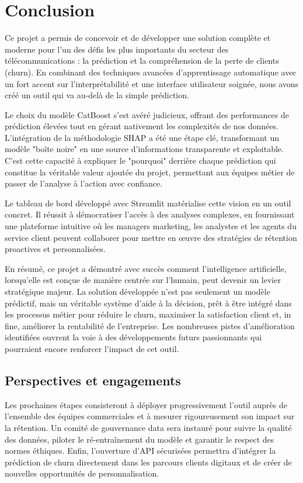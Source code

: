 \chapter{Conclusion}
\label{chap:conclusion}

Ce projet a permis de concevoir et de développer une solution complète et moderne pour l'un des défis les plus importants du secteur des télécommunications : la prédiction et la compréhension de la perte de clients (churn). En combinant des techniques avancées d'apprentissage automatique avec un fort accent sur l'interprétabilité et une interface utilisateur soignée, nous avons créé un outil qui va au-delà de la simple prédiction.

Le choix du modèle CatBoost s'est avéré judicieux, offrant des performances de prédiction élevées tout en gérant nativement les complexités de nos données. L'intégration de la méthodologie SHAP a été une étape clé, transformant un modèle "boîte noire" en une source d'informations transparente et exploitable. C'est cette capacité à expliquer le "pourquoi" derrière chaque prédiction qui constitue la véritable valeur ajoutée du projet, permettant aux équipes métier de passer de l'analyse à l'action avec confiance.

Le tableau de bord développé avec Streamlit matérialise cette vision en un outil concret. Il réussit à démocratiser l'accès à des analyses complexes, en fournissant une plateforme intuitive où les managers marketing, les analystes et les agents du service client peuvent collaborer pour mettre en œuvre des stratégies de rétention proactives et personnalisées.

En résumé, ce projet a démontré avec succès comment l'intelligence artificielle, lorsqu'elle est conçue de manière centrée sur l'humain, peut devenir un levier stratégique majeur. La solution développée n'est pas seulement un modèle prédictif, mais un véritable système d'aide à la décision, prêt à être intégré dans les processus métier pour réduire le churn, maximiser la satisfaction client et, in fine, améliorer la rentabilité de l'entreprise. Les nombreuses pistes d'amélioration identifiées ouvrent la voie à des développements futurs passionnants qui pourraient encore renforcer l'impact de cet outil.

\section*{Perspectives et engagements}
Les prochaines étapes consisteront à déployer progressivement l'outil auprès de l'ensemble des équipes commerciales et à mesurer rigoureusement son impact sur la rétention. Un comité de gouvernance data sera instauré pour suivre la qualité des données, piloter le ré-entraînement du modèle et garantir le respect des normes éthiques. Enfin, l'ouverture d'API sécurisées permettra d'intégrer la prédiction de churn directement dans les parcours clients digitaux et de créer de nouvelles opportunités de personnalisation.
